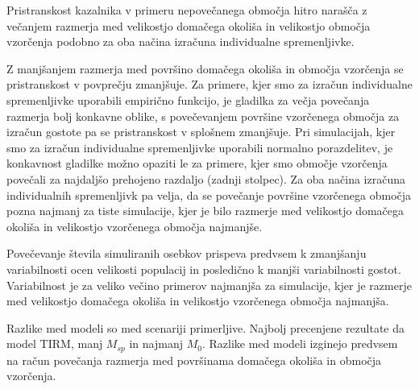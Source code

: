 Pristranskost kazalnika v primeru nepovečanega območja hitro narašča z večanjem razmerja med velikostjo domačega okoliša in velikostjo območja vzorčenja podobno za oba načina izračuna individualne spremenljivke.

Z manjšanjem razmerja med površino domačega okoliša in območja vzorčenja se pristranskost v povprečju zmanjšuje. Za primere, kjer smo za izračun individualne spremenljivke uporabili empirično funkcijo, je gladilka za večja povečanja razmerja bolj konkavne oblike, s povečevanjem površine vzorčenega območja za izračun gostote pa se pristranskost v splošnem zmanjšuje.
Pri simulacijah, kjer smo za izračun individualne spremenljivke uporabili normalno porazdelitev, je konkavnost gladilke možno opaziti le za primere, kjer smo območje vzorčenja povečali za najdaljšo prehojeno razdaljo (zadnji stolpec).
Za oba načina izračuna individualnih spremenljivk pa velja, da se povečanje površine vzorčenega območja pozna najmanj za tiste simulacije, kjer je bilo razmerje med velikostjo domačega okoliša in velikostjo vzorčenega območja najmanjše.

Povečevanje števila simuliranih osebkov prispeva predvsem k zmanjšanju variabilnosti ocen velikosti populacij in posledično k manjši variabilnosti gostot. Variabilnost je za veliko večino primerov najmanjša za simulacije, kjer je razmerje med velikostjo domačega okoliša in velikostjo vzorčenega območja najmanjša.

Razlike med modeli so med scenariji primerljive. Najbolj precenjene rezultate da model TIRM, manj $M_{sp}$ in najmanj $M_0$. Razlike med modeli izginejo predvsem na račun povečanja razmerja med površinama domačega okoliša in območja vzorčenja.

